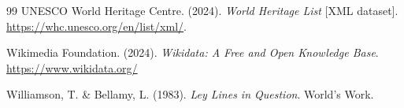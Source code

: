 \documentclass[12pt,a4paper]{article}
\begin{document}
\begin{thebibliography}{99}
{UNESCO World Heritage Centre}. (2024). \textit{World Heritage List}
[XML dataset]. \url{https://whc.unesco.org/en/list/xml/}.

{Wikimedia Foundation}. (2024). \textit{Wikidata: A Free and Open
Knowledge Base}. \url{https://www.wikidata.org/}

Williamson, T. \& Bellamy, L. (1983). \textit{Ley Lines in Question}.
World's Work.

\end{thebibliography}
\end{document}
